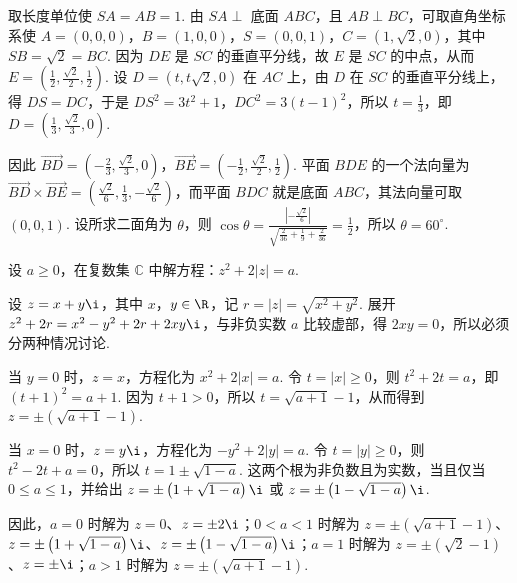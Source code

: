 \begin{solution}
取长度单位使 \(SA=AB=1\). 由 \(SA\perp\) 底面 \(ABC\)，且 \(AB\perp BC\)，可取直角坐标系使 \(A=(0,0,0)\)，\(B=(1,0,0)\)，\(S=(0,0,1)\)，\(C=(1,\sqrt{2},0)\)，其中 \(SB=\sqrt{2}=BC\). 因为 \(DE\) 是 \(SC\) 的垂直平分线，故 \(E\) 是 \(SC\) 的中点，从而 \(E=\left(\frac{1}{2},\frac{\sqrt{2}}{2},\frac{1}{2}\right)\). 设 \(D=(t,t\sqrt{2},0)\) 在 \(AC\) 上，由 \(D\) 在 \(SC\) 的垂直平分线上，得 \(DS=DC\)，于是 \(DS^2=3t^2+1\)，\(DC^2=3(t-1)^2\)，所以 \(t=\frac{1}{3}\)，即 \(D=\left(\frac{1}{3},\frac{\sqrt{2}}{3},0\right)\).

因此 \(\overrightarrow{BD}=\left(-\frac{2}{3},\frac{\sqrt{2}}{3},0\right)\)，\(\overrightarrow{BE}=\left(-\frac{1}{2},\frac{\sqrt{2}}{2},\frac{1}{2}\right)\). 平面 \(BDE\) 的一个法向量为 \(\overrightarrow{BD}\times\overrightarrow{BE}=\left(\frac{\sqrt{2}}{6},\frac{1}{3},-\frac{\sqrt{2}}{6}\right)\)，而平面 \(BDC\) 就是底面 \(ABC\)，其法向量可取 \((0,0,1)\). 设所求二面角为 \(\theta\)，则 \(\cos\theta=\frac{\left| -\frac{\sqrt{2}}{6}\right|}{\sqrt{\frac{2}{36}+\frac{1}{9}+\frac{2}{36}}}=\frac{1}{2}\)，所以 \(\theta=60^\circ\).
\end{solution}

\begin{problem}
设 \(a\geqslant 0\)，在复数集 \(\mathbb C\) 中解方程：\(z^2+2|z|=a\).
\end{problem}

\begin{solution}
设 \(z=x+y\i\)，其中 \(x\)，\(y\in\R\)，记 \(r=|z|=\sqrt{x^2+y^2}\). 展开 \(z^2+2r=x^2-y^2+2r+2xy\i\)，与非负实数 \(a\) 比较虚部，得 \(2xy=0\)，所以必须分两种情况讨论.

当 \(y=0\) 时，\(z=x\)，方程化为 \(x^2+2|x|=a\). 令 \(t=|x|\geqslant0\)，则 \(t^2+2t=a\)，即 \((t+1)^2=a+1\). 因为 \(t+1>0\)，所以 \(t=\sqrt{a+1}-1\)，从而得到 \(z=\pm\left(\sqrt{a+1}-1\right)\).

当 \(x=0\) 时，\(z=y\i\)，方程化为 \(-y^2+2|y|=a\). 令 \(t=|y|\geqslant0\)，则 \(t^2-2t+a=0\)，所以 \(t=1\pm\sqrt{1-a}\). 这两个根为非负数且为实数，当且仅当 \(0\leqslant a\leqslant1\)，并给出 \(z=\pm\left(1+\sqrt{1-a}\right)\i\) 或 \(z=\pm\left(1-\sqrt{1-a}\right)\i\).

因此，\(a=0\) 时解为 \(z=0\)、\(z=\pm2\i\)；\(0<a<1\) 时解为 \(z=\pm\left(\sqrt{a+1}-1\right)\)、\(z=\pm\left(1+\sqrt{1-a}\right)\i\)、\(z=\pm\left(1-\sqrt{1-a}\right)\i\)；\(a=1\) 时解为 \(z=\pm\left(\sqrt{2}-1\right)\)、\(z=\pm\i\)；\(a>1\) 时解为 \(z=\pm\left(\sqrt{a+1}-1\right)\).
\end{solution}

